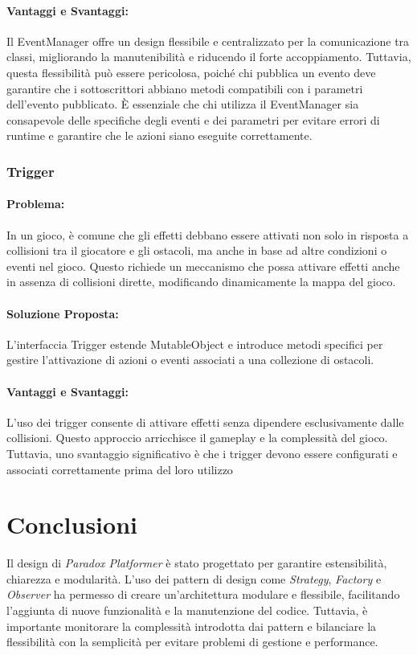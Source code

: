 \documentclass[a4paper,12pt]{report}
\begin{document}
\paragraph{Vantaggi e Svantaggi:}
Il EventManager offre un design flessibile e centralizzato per la comunicazione tra classi, migliorando la manutenibilità e riducendo il forte accoppiamento. Tuttavia, questa flessibilità può essere pericolosa, poiché chi pubblica un evento deve garantire che i sottoscrittori abbiano metodi compatibili con i parametri dell’evento pubblicato. È essenziale che chi utilizza il EventManager sia consapevole delle specifiche degli eventi e dei parametri per evitare errori di runtime e garantire che le azioni siano eseguite correttamente.

\subsubsection{Trigger}
\paragraph{Problema:} In un gioco, è comune che gli effetti debbano essere attivati non solo in risposta a collisioni tra il giocatore e gli ostacoli, ma anche in base ad altre condizioni o eventi nel gioco. Questo richiede un meccanismo che possa attivare effetti anche in assenza di collisioni dirette, modificando dinamicamente la mappa del gioco.
\paragraph{Soluzione Proposta:} L’interfaccia Trigger estende MutableObject e introduce metodi specifici per gestire l’attivazione di azioni o eventi associati a una collezione di ostacoli. 
\paragraph{Vantaggi e Svantaggi:}
L’uso dei trigger consente di attivare effetti senza dipendere esclusivamente dalle collisioni. Questo approccio arricchisce il gameplay e la complessità del gioco. Tuttavia, uno svantaggio significativo è che i trigger devono essere configurati e associati correttamente prima del loro utilizzo

	
	\section{Conclusioni}
	
	Il design di \textit{Paradox Platformer} è stato progettato per garantire estensibilità, chiarezza e modularità. L'uso dei pattern di design come \textit{Strategy}, \textit{Factory} e \textit{Observer} ha permesso di creare un'architettura modulare e flessibile, facilitando l'aggiunta di nuove funzionalità e la manutenzione del codice. Tuttavia, è importante monitorare la complessità introdotta dai pattern e bilanciare la flessibilità con la semplicità per evitare problemi di gestione e performance.
	
\end{document}
